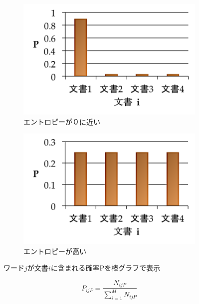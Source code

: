 \documentclass[review]{elsarticle}
\begin{document}
\begin{CJK}{UTF8}{min}
\begin{figure}[bh]
    \centering
    \begin{subfigure}[b]{0.4\linewidth}
        \includegraphics[width=\linewidth]{entropyzero_jp.png}
        \caption{エントロピーが０に近い}
    \end{subfigure}
    \begin{subfigure}[b]{0.4\linewidth}
        \includegraphics[width=\linewidth]{entropyhigh_jp.png}
        \caption{エントロピーが高い}
    \end{subfigure}
\caption{ワード\(j\)が文書\(i\)に含まれる確率Pを棒グラフで表示}
\label{fig:entropygraphs}
\end{figure}



\begin{equation}\label{eq:PijP}
P_{ijP} = \frac{N_{ijP}}{\sum_{i=1}^M N_{ijP}}
\end{equation}


\end{CJK}
\end{document}
